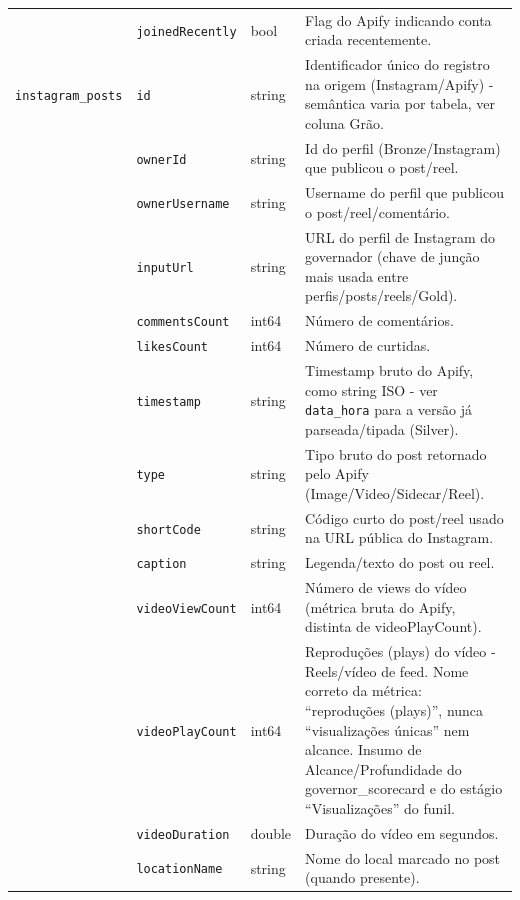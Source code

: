\begin{footnotesize}
\begin{longtable}{p{3.2cm}p{3.0cm}p{2.0cm}p{6.0cm}}
\texttt{} & \texttt{joinedRecently} & bool & Flag do Apify indicando conta criada recentemente. \\
\texttt{instagram\_\allowbreak{}posts} & \texttt{id} & string & Identificador único do registro na origem (Instagram/\allowbreak{}Apify) - semântica varia por tabela, ver coluna Grão. \\
\texttt{} & \texttt{ownerId} & string & Id do perfil (Bronze/\allowbreak{}Instagram) que publicou o post/\allowbreak{}reel. \\
\texttt{} & \texttt{ownerUsername} & string & Username do perfil que publicou o post/\allowbreak{}reel/\allowbreak{}comentário. \\
\texttt{} & \texttt{inputUrl} & string & URL do perfil de Instagram do governador (chave de junção mais usada entre perfis/\allowbreak{}posts/\allowbreak{}reels/\allowbreak{}Gold). \\
\texttt{} & \texttt{commentsCount} & int64 & Número de comentários. \\
\texttt{} & \texttt{likesCount} & int64 & Número de curtidas. \\
\texttt{} & \texttt{timestamp} & string & Timestamp bruto do Apify, como string ISO - ver \texttt{data\_\allowbreak{}hora} para a versão já parseada/\allowbreak{}tipada (Silver). \\
\texttt{} & \texttt{type} & string & Tipo bruto do post retornado pelo Apify (Image/\allowbreak{}Video/\allowbreak{}Sidecar/\allowbreak{}Reel). \\
\texttt{} & \texttt{shortCode} & string & Código curto do post/\allowbreak{}reel usado na URL pública do Instagram. \\
\texttt{} & \texttt{caption} & string & Legenda/\allowbreak{}texto do post ou reel. \\
\texttt{} & \texttt{videoViewCount} & int64 & Número de views do vídeo (métrica bruta do Apify, distinta de videoPlayCount). \\
\texttt{} & \texttt{videoPlayCount} & int64 & Reproduções (plays) do vídeo - Reels/\allowbreak{}vídeo de feed. Nome correto da métrica: ``reproduções (plays)'', nunca ``visualizações únicas'' nem alcance. Insumo de Alcance/\allowbreak{}Profundidade do governor\_\allowbreak{}scorecard e do estágio ``Visualizações'' do funil. \\
\texttt{} & \texttt{videoDuration} & double & Duração do vídeo em segundos. \\
\texttt{} & \texttt{locationName} & string & Nome do local marcado no post (quando presente). \\

\end{longtable}
\end{footnotesize}
